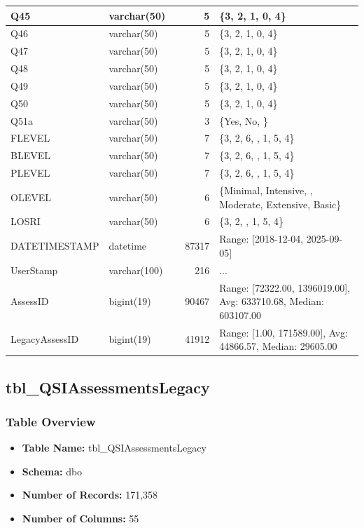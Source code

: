 \begin{landscape}
\begin{longtable}{|l|l|l|r|p{6cm}|}
\hline
Q45 & varchar(50) &  & 5 & \{3, 2, 1, 0, 4\} \\
\hline
Q46 & varchar(50) &  & 5 & \{3, 2, 1, 0, 4\} \\
\hline
Q47 & varchar(50) &  & 5 & \{3, 2, 1, 0, 4\} \\
\hline
Q48 & varchar(50) &  & 5 & \{3, 2, 1, 0, 4\} \\
\hline
Q49 & varchar(50) &  & 5 & \{3, 2, 1, 0, 4\} \\
\hline
Q50 & varchar(50) &  & 5 & \{3, 2, 1, 0, 4\} \\
\hline
Q51a & varchar(50) &  & 3 & \{Yes, No, \} \\
\hline
FLEVEL & varchar(50) &  & 7 & \{3, 2, 6, , 1, 5, 4\} \\
\hline
BLEVEL & varchar(50) &  & 7 & \{3, 2, 6, , 1, 5, 4\} \\
\hline
PLEVEL & varchar(50) &  & 7 & \{3, 2, 6, , 1, 5, 4\} \\
\hline
OLEVEL & varchar(50) &  & 6 & \{Minimal, Intensive, , Moderate, Extensive, Basic\} \\
\hline
LOSRI & varchar(50) &  & 6 & \{3, 2, , 1, 5, 4\} \\
\hline
DATETIMESTAMP & datetime &  & 87317 & Range: [2018-12-04, 2025-09-05] \\
\hline
UserStamp & varchar(100) &  & 216 & ... \\
\hline
AssessID & bigint(19) &  & 90467 & Range: [72322.00, 1396019.00], Avg: 633710.68, Median: 603107.00 \\
\hline
LegacyAssessID & bigint(19) &  & 41912 & Range: [1.00, 171589.00], Avg: 44866.57, Median: 29605.00 \\
\hline
\end{longtable}

\subsection{tbl\_QSIAssessmentsLegacy}

\subsubsection{Table Overview}
\begin{itemize}
\item \textbf{Table Name:} tbl\_QSIAssessmentsLegacy
\item \textbf{Schema:} dbo
\item \textbf{Number of Records:} 171,358
\item \textbf{Number of Columns:} 55
\end{itemize}


\end{landscape}
